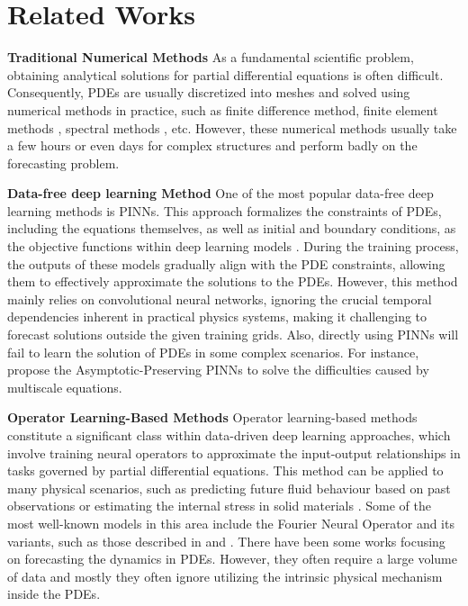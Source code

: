 \section{Related Works}
\label{sec: related_works}
\textbf{Traditional Numerical Methods} As a fundamental scientific problem, obtaining analytical solutions for partial differential equations is often difficult. Consequently, PDEs are usually discretized into meshes and solved using numerical methods in practice, such as finite difference method\cite{sod1978survey}, finite element methods \cite{huebner2001finite}, spectral methods \cite{shen2011spectral}, etc. However, these numerical methods usually take a few hours or even days for complex structures \cite{umetani2018learning} and perform badly on the forecasting problem.

\textbf{Data-free deep learning Method} One of the most popular data-free deep learning methods is PINNs. This approach formalizes the constraints of PDEs, including the equations themselves, as well as initial and boundary conditions, as the objective functions within deep learning models \cite{raissi2019physics,yu2018deep}. During the training process, the outputs of these models gradually align with the PDE constraints, allowing them to effectively approximate the solutions to the PDEs. However, this method mainly relies
on convolutional neural networks, ignoring the crucial temporal dependencies inherent in practical physics systems, making it challenging to forecast solutions outside the given training grids. Also, directly using PINNs will fail to learn the solution of PDEs in some complex scenarios. For instance, \cite{jin2023asymptotic,liu2024asymptotic} propose the Asymptotic-Preserving PINNs to solve the difficulties caused by multiscale equations.

\textbf{Operator Learning-Based Methods} 
Operator learning-based methods constitute a significant class within data-driven deep learning approaches, which involve training neural operators to approximate the input-output relationships in tasks governed by partial differential equations. This method can be applied to many physical scenarios, such as predicting future fluid behaviour based on past observations or estimating the internal stress in solid materials \cite{lu2021learning}. Some of the most well-known models in this area include the Fourier Neural Operator \cite{li2020fourier} and its variants, such as those described in  \cite{li2024geometry} and \cite{rahman2022u}. There have been some works \cite{yin2022continuous} focusing on forecasting the dynamics in PDEs. However, they often require a large volume of data and mostly they often ignore utilizing the intrinsic physical mechanism inside the PDEs.

